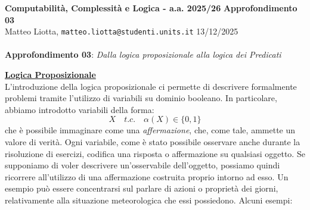 \documentclass[a4paper,10pt]{article}
\newcommand{\EsercitazioneNum}{03}
\newcommand{\Data}{13/12/2025}
\begin{document}
\footnotesize  %

\noindent
\small \textbf{Computabilità, Complessità e Logica - a.a. 2025/26} \hfill \textbf{Approfondimento \EsercitazioneNum} \\[0.2cm]
\scriptsize Matteo Liotta, \texttt{matteo.liotta@studenti.units.it} \hfill \Data \\[0.2cm]

\noindent\makebox[\linewidth]{\rule{\linewidth}{0.4pt}} \\[1cm]


\noindent\Large \textbf{Approfondimento \EsercitazioneNum}: \textit{Dalla logica proposizionale alla logica dei Predicati}\\[0.1cm]



\small

\underline{\textbf{Logica Proposizionale}}\\

L'introduzione della logica proposizionale ci permette di descrivere formalmente problemi tramite l'utilizzo di variabili su dominio booleano. In particolare, abbiamo introdotto variabili della forma: $$X\quad t.c.\quad \alpha(X)\in \{0,1\}$$ che è possibile immaginare come una \textit{affermazione}, che, come tale, ammette un valore di verità. Ogni variabile, come è stato possibile osservare anche durante la risoluzione di esercizi, codifica una risposta o affermazione su qualsiasi oggetto. Se supponiamo di voler descrivere un'osservabile dell'oggetto, possiamo quindi ricorrere all'utilizzo di una affermazione costruita proprio intorno ad esso. Un esempio può essere concentrarsi sul parlare di azioni o proprietà dei giorni, relativamente alla situazione meteorologica che essi possiedono. Alcuni esempi:
\end{document}
